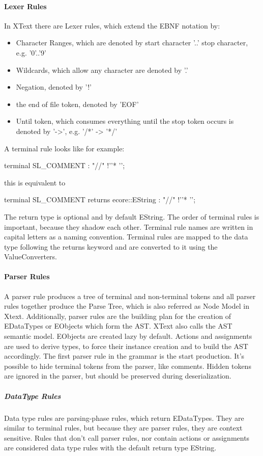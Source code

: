 \paragraph{Lexer Rules}
In XText there are Lexer rules,  which extend the EBNF notation by:
\begin{itemize}
	\item Character Ranges, which are denoted by start character '..' stop character, e.g. '0'..'9' 
	\item Wildcards, which allow any character are denoted by '.'
	\item Negation, denoted by '!'
	\item the end of file token, denoted by 'EOF'
	\item Until token, which consumes everything until the stop token occurs is denoted by '->', e.g. '/*' -> '*/'
\end{itemize}
A terminal rule looks like for example:
\begin{xtxt}
terminal SL_COMMENT : "//" !'\n'* '\n';
\end{xtxt}
this is equivalent to 
\begin{xtxt}
terminal SL_COMMENT returns ecore::EString : "//" !'\n'* '\n';
\end{xtxt}
The return type is optional and by default EString. The order of terminal rules is important, because they shadow each other. Terminal rule names are written in capital letters as a naming convention. Terminal rules are mapped to the data type following the returns keyword and are converted to it using the ValueConverters.

\paragraph{Parser Rules}
A parser rule produces a tree of terminal and non-terminal tokens and all parser rules together produce the Parse Tree, which is also referred as Node Model in Xtext. Additionally, parser rules are the building plan for the creation of EDataTypes or EObjects which form the AST. XText also calls the AST semantic model. EObjects are created lazy by default. Actions and assignments are used to derive types, to force their instance creation and to build the AST accordingly. The first parser rule in the grammar is the start production. It's possible to hide terminal tokens from the parser, like comments. Hidden tokens are ignored in the parser, but should be preserved during deserialization.

\subparagraph{DataType Rules}
Data type rules are parsing-phase rules, which return EDataTypes. They are similar to terminal rules, but because they are parser rules, they are context sensitive. Rules that don't call parser rules, nor contain actions or assignments are considered data type rules with the default return type EString. 
\begin{xtxt}
Number returns ecore::EInt : NUM ('.' NUM*)?;}
\end{xtxt}

